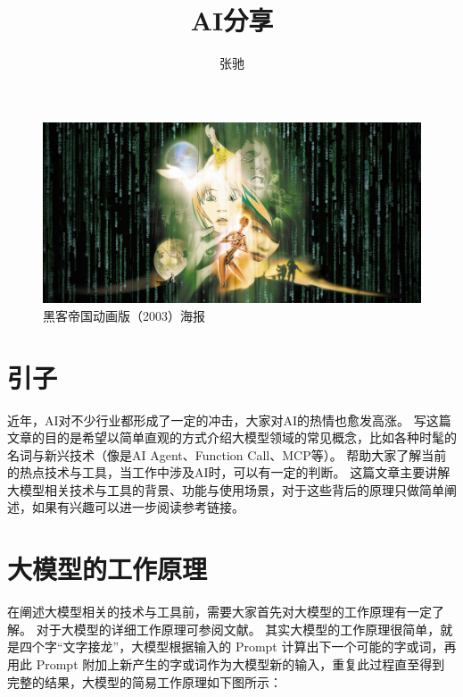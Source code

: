 \documentclass[letterpaper,11pt]{article}
\numberwithin{equation}{section}
\begin{document}
\title{AI分享}
\author{张驰}
\maketitle

\begin{figure}[htbp]
    \centering
    \includegraphics[width=1\textwidth]{../../assets/imgs/ai_share/bg.jpg}
    \caption*{黑客帝国动画版（2003）海报}
\end{figure}

\section{引子}

近年，AI对不少行业都形成了一定的冲击，大家对AI的热情也愈发高涨。
写这篇文章的目的是希望以简单直观的方式介绍大模型领域的常见概念，比如各种时髦的名词与新兴技术（像是AI Agent、Function Call、MCP等）。
帮助大家了解当前的热点技术与工具，当工作中涉及AI时，可以有一定的判断。
这篇文章主要讲解大模型相关技术与工具的背景、功能与使用场景，对于这些背后的原理只做简单阐述，如果有兴趣可以进一步阅读参考链接。

\section{大模型的工作原理}

在阐述大模型相关的技术与工具前，需要大家首先对大模型的工作原理有一定了解。
对于大模型的详细工作原理可参阅文献。
其实大模型的工作原理很简单，就是四个字“文字接龙”，大模型根据输入的 Prompt 计算出下一个可能的字或词，再用此 Prompt 附加上新产生的字或词作为大模型新的输入，重复此过程直至得到完整的结果，大模型的简易工作原理如下图所示：
\end{document}
